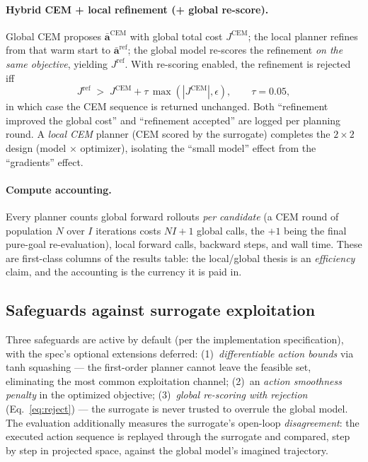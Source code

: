 \documentclass[11pt,a4paper]{article}
\newcommand{\abar}{\bar{\mathbf{a}}}
\begin{document}
\paragraph{Hybrid CEM + local refinement (+ global re-score).} Global CEM
proposes $\abar^{\mathrm{CEM}}$ with global total cost $J^{\mathrm{CEM}}$;
the local planner refines from that warm start to $\abar^{\mathrm{ref}}$;
the global model re-scores the refinement \emph{on the same objective},
yielding $J^{\mathrm{ref}}$. With re-scoring enabled, the refinement is
rejected iff
\begin{equation}
J^{\mathrm{ref}} \;>\; J^{\mathrm{CEM}} + \tau\,\max(|J^{\mathrm{CEM}}|, \epsilon),
\qquad \tau = 0.05,
\label{eq:reject}
\end{equation}
in which case the CEM sequence is returned unchanged. Both
``refinement improved the global cost'' and ``refinement accepted'' are logged
per planning round. A \emph{local CEM} planner (CEM scored by the surrogate)
completes the $2{\times}2$ design (model $\times$ optimizer), isolating the
``small model'' effect from the ``gradients'' effect.

\paragraph{Compute accounting.} Every planner counts global forward rollouts
\emph{per candidate} (a CEM round of population $N$ over $I$ iterations costs
$NI{+}1$ global calls, the $+1$ being the final pure-goal re-evaluation),
local forward calls, backward steps, and wall time. These are first-class
columns of the results table: the local/global thesis is an
\emph{efficiency} claim, and the accounting is the currency it is paid in.

\subsection{Safeguards against surrogate exploitation}
\label{sec:safeguards}

Three safeguards are active by default (per the implementation
specification), with the spec's optional extensions deferred:
(1)~\emph{differentiable action bounds} via tanh squashing --- the first-order
planner cannot leave the feasible set, eliminating the most common
exploitation channel; (2)~an \emph{action smoothness penalty} in the
optimized objective; (3)~\emph{global re-scoring with rejection}
(Eq.~\ref{eq:reject}) --- the surrogate is never trusted to overrule the
global model. The evaluation additionally measures the surrogate's open-loop
\emph{disagreement}: the executed action sequence is replayed through the
surrogate and compared, step by step in projected space, against the global
model's imagined trajectory.
\end{document}
